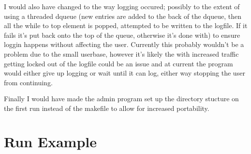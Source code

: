 \documentclass[10pt,letterpaper]{article}
\begin{document}
			I would also have changed to the way logging occured; possibly to the extent of using a threaded dqueue (new entries are added to the back of the dqueue, then all the while to top element is popped, attempted to be written to the logfile. If it fails it's put back onto the top of the queue, otherwise it's done with) to ensure loggin happens without affecting the user. Currently this probably wouldn't be a problem due to the small userbase, however it's likely the with increased traffic getting locked out of the logfile could be an issue and at current the program would either give up logging or wait until it can log, either way stopping the user from continuing.

			Finally I would have made the admin program set up the directory stucture on the first run instead of the makefile to allow for increased portability.

		\section{Run Example}
			

		
		
		
\end{document}
